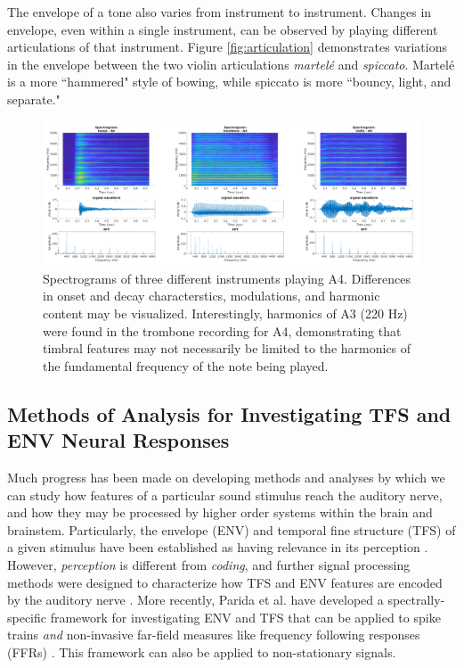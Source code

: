 \documentclass[conference]{IEEEtran}
\begin{document}
The envelope of a tone also varies from instrument to instrument. Changes in envelope, even within a single instrument, can be observed by playing different articulations of that instrument. Figure \ref{fig:articulation} demonstrates variations in the envelope between the two violin articulations \textit{martel\'{e}} and \textit{spiccato}. Martel\'{e} is a more ``hammered" style of bowing, while spiccato is more ``bouncy, light, and separate."

\begin{figure}
\includegraphics[width = \textwidth]{spects}
\caption{Spectrograms of three different instruments playing A4. Differences in onset and decay characterstics, modulations, and harmonic content may be visualized. Interestingly, harmonics of A3 (220 Hz) were found in the trombone recording for A4, demonstrating that timbral features may not necessarily be limited to the harmonics of the fundamental frequency of the note being played.}
\label{fig:spects}
\end{figure}


\subsection{Methods of Analysis for Investigating TFS and ENV Neural Responses}
Much progress has been made on developing methods and analyses by which we can study how features of a particular sound stimulus reach the auditory nerve, and how they may be processed by higher order systems within the brain and brainstem. Particularly, the envelope (ENV) and temporal fine structure (TFS) of a given stimulus have been established as having relevance in its perception \cite{smith_chimaeric_2002}. However, \textit{perception }is different from \textit{coding}, and further signal processing methods were designed to characterize how TFS and ENV features are encoded by the auditory nerve \cite{heinz_quantifying_2009}. More recently, Parida et al. have developed a spectrally-specific framework for investigating ENV and TFS that can be applied to spike trains \textit{and} non-invasive far-field measures like frequency following responses (FFRs) \cite{parida_spectrally_2020}. This framework can also be applied to non-stationary signals. 
\end{document}
